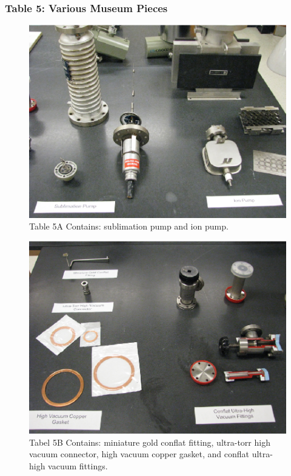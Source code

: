 \documentclass{book}
\begin{document}
\subsubsection{Table 5: Various Museum Pieces}

\begin{figure}[H]
\includegraphics[scale=0.9]{Museum-Pieces-Table5A}
\caption[align=left]{Table 5A Contains: sublimation pump and ion pump.}
\end{figure}


\begin{figure}[H]
\includegraphics[scale=0.9]{Museum-Pieces-Table5B}
\caption{Tabel 5B Contains: miniature gold conflat fitting, ultra-torr high vacuum connector, high vacuum copper gasket, and conflat ultra-high vacuum fittings.}
\end{figure}
\end{document}
